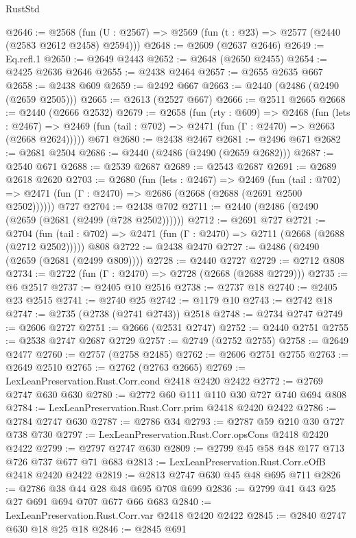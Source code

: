 \begin{lexlean}{RustStd}
\begin{coremodule}
{\begin{coremodule}
{{{{{{{{{{{{@2646 := @2568 (fun (U : @2567) => @2569 (fun (t : @23) => @2577 (@2440 (@2583 @2612 @2458) @2594)))
@2648 := @2609 (@2637 @2646)
@2649 := Eq.refl.{1}
@2650 := @2649 @2443
@2652 := @2648 (@2650 @2455)
@2654 := @2425 @2636 @2646
@2655 := @2438 @2464
@2657 := @2655 @2635 @667
@2658 := @2438 @609
@2659 := @2492 @667
@2663 := @2440 (@2486 (@2490 (@2659 @2505)))
@2665 := @2613 (@2527 @667)
@2666 := @2511 @2665
@2668 := @2440 (@2666 @2532)
@2679 := @2658
    (fun (rty : @609) =>
    @2468
      (fun (lets : @2467) =>
      @2469 (fun (tail : @702) => @2471 (fun (Γ : @2470) => @2663 (@2668 @2624)))))
    @671
@2680 := @2438 @2467
@2681 := @2496 @671
@2682 := @2681 @2504
@2686 := @2440 (@2486 (@2490 (@2659 @2682)))
@2687 := @2540 @671
@2688 := @2539 @2687
@2689 := @2543 @2687
@2691 := @2689 @2618 @2620
@2703 := @2680
    (fun (lets : @2467) =>
    @2469
      (fun (tail : @702) => @2471 (fun (Γ : @2470) => @2686 (@2668 (@2688 (@2691 @2500 @2502))))))
    @727
@2704 := @2438 @702
@2711 := @2440 (@2486 (@2490 (@2659 (@2681 (@2499 (@728 @2502))))))
@2712 := @2691 @727
@2721 := @2704
    (fun (tail : @702) => @2471 (fun (Γ : @2470) => @2711 (@2668 (@2688 (@2712 @2502)))))
    @808
@2722 := @2438 @2470
@2727 := @2486 (@2490 (@2659 (@2681 (@2499 @809))))
@2728 := @2440 @2727
@2729 := @2712 @808
@2734 := @2722 (fun (Γ : @2470) => @2728 (@2668 (@2688 @2729)))
@2735 := @6 @2517
@2737 := @2405 @10 @2516
@2738 := @2737 @18
@2740 := @2405 @23 @2515
@2741 := @2740 @25
@2742 := @1179 @10
@2743 := @2742 @18
@2747 := @2735 (@2738 (@2741 @2743)) @2518
@2748 := @2734 @2747
@2749 := @2606 @2727
@2751 := @2666 (@2531 @2747)
@2752 := @2440 @2751
@2755 := @2538 @2747 @2687 @2729
@2757 := @2749 (@2752 @2755)
@2758 := @2649 @2477
@2760 := @2757 (@2758 @2485)
@2762 := @2606 @2751 @2755
@2763 := @2649 @2510
@2765 := @2762 (@2763 @2665)
@2769 := LexLeanPreservation.Rust.Corr.cond @2418 @2420 @2422
@2772 := @2769 @2747 @630 @630
@2780 := @2772 @60 @111 @110 @30 @727 @740 @694 @808
@2784 := LexLeanPreservation.Rust.Corr.prim @2418 @2420 @2422
@2786 := @2784 @2747 @630
@2787 := @2786 @34
@2793 := @2787 @59 @210 @30 @727 @738 @730
@2797 := LexLeanPreservation.Rust.Corr.opsCons @2418 @2420 @2422
@2799 := @2797 @2747 @630
@2809 := @2799 @45 @58 @48 @177 @713 @726 @737 @677 @71 @683
@2813 := LexLeanPreservation.Rust.Corr.eOfB @2418 @2420 @2422
@2819 := @2813 @2747 @630 @45 @48 @695 @711
@2826 := @2786 @38 @44 @28 @48 @695 @708 @699
@2836 := @2799 @41 @43 @25 @27 @691 @694 @707 @677 @66 @683
@2840 := LexLeanPreservation.Rust.Corr.var @2418 @2420 @2422
@2845 := @2840 @2747 @630 @18 @25 @18
@2846 := @2845 @691
}}}}}}}}}}}}
\end{coremodule}}
\end{coremodule}
\end{lexlean}
